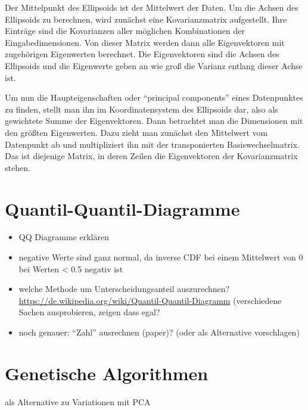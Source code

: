  Der Mittelpunkt des Ellipsoids ist der Mittelwert der Daten.
 Um die Achsen des Ellipsoids zu berechnen, wird zunächst eine Kovarianzmatrix aufgestellt. Ihre Einträge sind die Kovarianzen aller möglichen Kombinationen der Eingabedimensionen. Von dieser Matrix werden dann alle Eigenvektoren mit zugehörigen Eigenwerten berechnet.
 Die Eigenvektoren sind die Achsen des Ellipsoids und die Eigenwerte geben an wie groß die Varianz entlang dieser Achse ist.
 
 Um nun die Haupteigenschaften oder "`principal components"' eines Datenpunktes zu finden, stellt man ihn im Koordinatensystem des Ellipsoids dar, also als gewichtete Summe der Eigenvektoren. Dann betrachtet man die Dimensionen mit den größten Eigenwerten. Dazu zieht man zunächst den Mittelwert vom Datenpunkt ab und multipliziert ihn mit der transponierten Basiswechselmatrix. Das ist diejenige Matrix, in deren Zeilen die Eigenvektoren der Kovarianzmatrix stehen.

 
\section{Quantil-Quantil-Diagramme} 
\label{qqdiagrams}

 \begin{itemize}
  \item QQ Diagramme erklären
  \item negative Werte sind ganz normal, da inverse CDF bei einem Mittelwert von 0 bei Werten < 0.5 negativ ist
  \item welche Methode um Unterscheidungsanteil auszurechnen? \url{https://de.wikipedia.org/wiki/Quantil-Quantil-Diagramm} (verschiedene Sachen ausprobieren, zeigen dass egal?
  \item noch genauer: "`Zahl"' ausrechnen (paper)? (oder als Alternative vorschlagen)
 \end{itemize}


\section{Genetische Algorithmen}

als Alternative zu Variationen mit PCA

